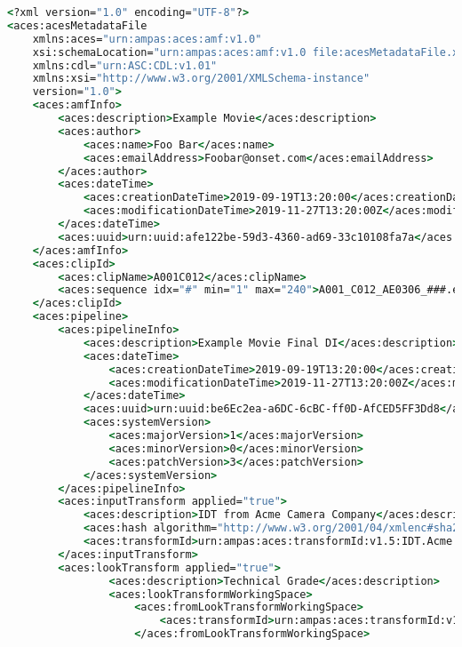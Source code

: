 \begin{lstlisting}[language=csh]
<?xml version="1.0" encoding="UTF-8"?>
<aces:acesMetadataFile 
    xmlns:aces="urn:ampas:aces:amf:v1.0"
    xsi:schemaLocation="urn:ampas:aces:amf:v1.0 file:acesMetadataFile.xsd"
    xmlns:cdl="urn:ASC:CDL:v1.01"
    xmlns:xsi="http://www.w3.org/2001/XMLSchema-instance"
    version="1.0">
    <aces:amfInfo>
        <aces:description>Example Movie</aces:description>
        <aces:author>
            <aces:name>Foo Bar</aces:name>
            <aces:emailAddress>Foobar@onset.com</aces:emailAddress>
        </aces:author>
        <aces:dateTime>
            <aces:creationDateTime>2019-09-19T13:20:00</aces:creationDateTime>
            <aces:modificationDateTime>2019-11-27T13:20:00Z</aces:modificationDateTime>
        </aces:dateTime>
        <aces:uuid>urn:uuid:afe122be-59d3-4360-ad69-33c10108fa7a</aces:uuid>
    </aces:amfInfo>
    <aces:clipId>
        <aces:clipName>A001C012</aces:clipName>
        <aces:sequence idx="#" min="1" max="240">A001_C012_AE0306_###.exr</aces:sequence>
    </aces:clipId>
    <aces:pipeline>
        <aces:pipelineInfo>
            <aces:description>Example Movie Final DI</aces:description>
            <aces:dateTime>
                <aces:creationDateTime>2019-09-19T13:20:00</aces:creationDateTime>
                <aces:modificationDateTime>2019-11-27T13:20:00Z</aces:modificationDateTime>
            </aces:dateTime>
            <aces:uuid>urn:uuid:be6Ec2ea-a6DC-6cBC-ff0D-AfCED5FF3Dd8</aces:uuid>
            <aces:systemVersion>
                <aces:majorVersion>1</aces:majorVersion>
                <aces:minorVersion>0</aces:minorVersion>
                <aces:patchVersion>3</aces:patchVersion>
            </aces:systemVersion>
        </aces:pipelineInfo>
        <aces:inputTransform applied="true">
            <aces:description>IDT from Acme Camera Company</aces:description>
            <aces:hash algorithm="http://www.w3.org/2001/04/xmlenc#sha256">1531ea6ef06c5b0a5bea80c94f60c7b68e3989e3c90b8ebd25c28aa4670c30f8</aces:hash>
            <aces:transformId>urn:ampas:aces:transformId:v1.5:IDT.Acme.Camera.a1.v1</aces:transformId>
        </aces:inputTransform>
        <aces:lookTransform applied="true">
                <aces:description>Technical Grade</aces:description>
                <aces:lookTransformWorkingSpace>
                    <aces:fromLookTransformWorkingSpace>
                        <aces:transformId>urn:ampas:aces:transformId:v1.5:ACEScsc.Academy.ACEScct_to_ACES.a1.0.3</aces:transformId>
                    </aces:fromLookTransformWorkingSpace>

\end{lstlisting}
